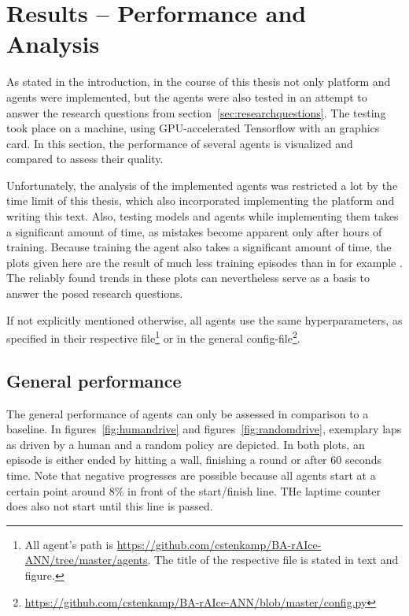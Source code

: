 \chapter{Results -- Performance and Analysis}
\label{ch:resultsanalysis}

As stated in the introduction, in the course of this thesis not only platform and agents were implemented, but the agents were also tested in an attempt to answer the research questions from section~\ref{sec:researchquestions}. The testing took place on a  machine, using GPU-accelerated Tensorflow with an  graphics card. In this section, the performance of several agents is visualized and compared to assess their quality. 

Unfortunately, the analysis of the implemented agents was restricted a lot by the time limit of this thesis, which also incorporated implementing the platform and writing this text. Also, testing models and agents while implementing them takes a significant amount of time, as mistakes become apparent only after hours of training. Because training the agent also takes a significant amount of time, the plots given here are the result of much less training episodes than in for example \cite{mnih_human-level_2015}. The reliably found trends in these plots can nevertheless serve as a basis to answer the posed research questions.

If not explicitly mentioned otherwise, all agents use the same hyperparameters, as specified in their respective file\footnote{All agent's path is \url{https://github.com/cstenkamp/BA-rAIce-ANN/tree/master/agents}. The title of the respective file is stated in text and figure.} or in the general config-file\footnote{\url{https://github.com/cstenkamp/BA-rAIce-ANN/blob/master/config.py}}.


\section{General performance}

The general performance of agents can only be assessed in comparison to a baseline. In figures~\ref{fig:humandrive} and figures~\ref{fig:randomdrive}, exemplary laps as driven by a human and a random policy are depicted. In both plots, an episode is either ended by hitting a wall, finishing a round or after 60 seconds time. Note that negative progresses are possible because all agents start at a certain point around $8\%$ in front of the start/finish line. THe laptime counter does also not start until this line is passed.


